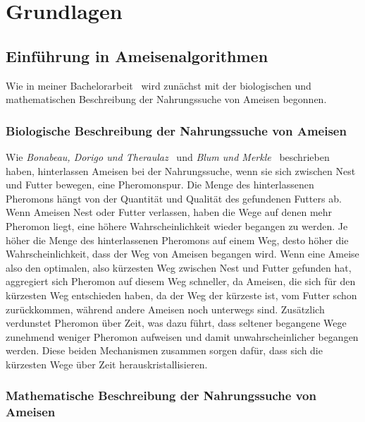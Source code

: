 \documentclass[fontsize=12, a4aper]{scrartcl}
\begin{document}
	\newpage
	
	\section{Grundlagen} \label{sec:Grundlagen}
	
	\subsection{Einführung in Ameisenalgorithmen} \label{subsec:Einfuehrung_In_Ameisenalgorithmen}
	
	Wie in meiner Bachelorarbeit~\cite{FCM_2019} wird zunächst mit der biologischen und mathematischen Beschreibung der Nahrungssuche von Ameisen begonnen.
	
	\subsubsection{Biologische Beschreibung der Nahrungssuche von Ameisen} \label{subsubsec:Einfuehrung_In_Ameisenalgorithmen:Biologische_Beschreibung_Der_Nahrungssuche_Von_Ameisen}
	
	Wie \textit{Bonabeau, Dorigo und Theraulaz}~\cite{bonabeau1999swarm} und \textit{Blum und Merkle}~\cite{christian2008swarm} beschrieben haben, hinterlassen Ameisen bei der Nahrungssuche, wenn sie sich zwischen Nest und Futter bewegen, eine Pheromonspur. Die Menge des hinterlassenen Pheromons hängt von der Quantität und Qualität des gefundenen Futters ab. Wenn Ameisen Nest oder Futter verlassen, haben die Wege auf denen mehr Pheromon liegt, eine höhere Wahrscheinlichkeit wieder begangen zu werden. Je höher die Menge des hinterlassenen Pheromons auf einem Weg, desto höher die Wahrscheinlichkeit, dass der Weg von Ameisen begangen wird. Wenn eine Ameise also den optimalen, also kürzesten Weg zwischen Nest und Futter gefunden hat, aggregiert sich Pheromon auf diesem Weg schneller, da Ameisen, die sich für den kürzesten Weg entschieden haben, da der Weg der kürzeste ist, vom Futter schon zurückkommen, während andere Ameisen noch unterwegs sind. Zusätzlich verdunstet Pheromon über Zeit, was dazu führt, dass seltener begangene Wege zunehmend weniger Pheromon aufweisen und damit unwahrscheinlicher begangen werden. Diese beiden Mechanismen zusammen sorgen dafür, dass sich die kürzesten Wege über Zeit herauskristallisieren.
	
	\subsubsection{Mathematische Beschreibung der Nahrungssuche von Ameisen} \label{subsubsec:Einfuehrung_In_Ameisenalgorithmen:Mathematische_Beschreibung_Der_Nahrungssuche_Von_Ameisen}
	
\end{document}

